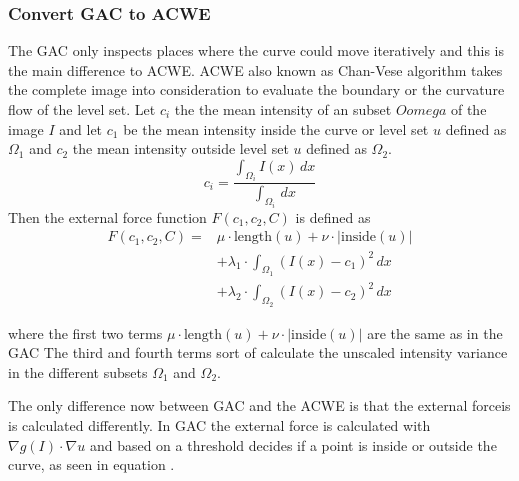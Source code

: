 \subsubsection{Convert GAC to ACWE}
\label{sus:acwe_ransac}
The GAC only inspects places where the curve could move iteratively and this is the main difference to ACWE. ACWE also known as Chan-Vese algorithm takes the complete image into consideration to evaluate the boundary or the curvature flow of the level set. 
Let $c_i$ the the mean intensity of an subset $Oomega$ of the image $I$ and let $c_1$ be the mean intensity inside the curve or level set $u$ defined as $\Omega_1$ and $c_2$ the mean intensity outside level set $u$ defined as $\Omega_2$. 
\begin{equation}
    c_{i}= \frac{ \int_{\Omega_{i}} I(x) \,dx}{\int_{\Omega_{i}} \, dx }
    \label{eq:meanintensity}
\end{equation}
Then the external force function $F(c_1,c_2,C)$ is defined as
\begin{equation}
    \begin{split}
    F(c_1, c_2, C) = & \mu \cdot \text{length}(u) + \nu \cdot |\text{inside}(u)| \\
    & + \lambda_1 \cdot \int_{\Omega_1} (I(x) - c_1)^2 \, dx \\
    & + \lambda_2 \cdot \int_{\Omega_2} (I(x) - c_2)^2 \, dx
    \end{split}
    \label{eq:curvatureflow}
    \end{equation}

where the first two terms $\mu \cdot \text{length}(u) + \nu \cdot |\text{inside}(u)|$ are the same as in the GAC The third and fourth terms sort of calculate the unscaled intensity variance in the different subsets $\Omega_1$ and $\Omega_2$. 

The only difference now between GAC and the ACWE is that the external forceis is calculated differently. In GAC the external force is calculated with $\nabla g(I) \cdot \nabla u$ and based on a threshold decides if a point is inside or outside the curve, as seen in equation . 

